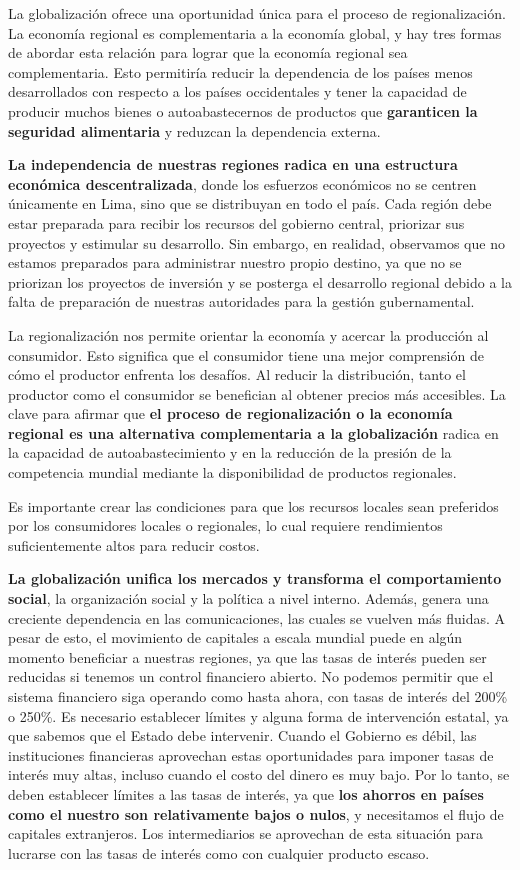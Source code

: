 \documentclass[
  jou,
  floatsintext,
  longtable,
  a4paper,
  nolmodern,
  notxfonts,
  notimes,
  12pt,
  colorlinks=true,linkcolor=blue,citecolor=blue,urlcolor=blue]{apa7}
\begin{document}
La globalización ofrece una oportunidad única para el proceso de
regionalización. La economía regional es complementaria a la economía
global, y hay tres formas de abordar esta relación para lograr que la
economía regional sea complementaria. Esto permitiría reducir la
dependencia de los países menos desarrollados con respecto a los países
occidentales y tener la capacidad de producir muchos bienes o
autoabastecernos de productos que \textbf{garanticen la seguridad
alimentaria} y reduzcan la dependencia externa.

\textbf{La independencia de nuestras regiones radica en una estructura
económica descentralizada}, donde los esfuerzos económicos no se centren
únicamente en Lima, sino que se distribuyan en todo el país. Cada región
debe estar preparada para recibir los recursos del gobierno central,
priorizar sus proyectos y estimular su desarrollo. Sin embargo, en
realidad, observamos que no estamos preparados para administrar nuestro
propio destino, ya que no se priorizan los proyectos de inversión y se
posterga el desarrollo regional debido a la falta de preparación de
nuestras autoridades para la gestión gubernamental.

La regionalización nos permite orientar la economía y acercar la
producción al consumidor. Esto significa que el consumidor tiene una
mejor comprensión de cómo el productor enfrenta los desafíos. Al reducir
la distribución, tanto el productor como el consumidor se benefician al
obtener precios más accesibles. La clave para afirmar que \textbf{el
proceso de regionalización o la economía regional es una alternativa
complementaria a la globalización} radica en la capacidad de
autoabastecimiento y en la reducción de la presión de la competencia
mundial mediante la disponibilidad de productos regionales.

Es importante crear las condiciones para que los recursos locales sean
preferidos por los consumidores locales o regionales, lo cual requiere
rendimientos suficientemente altos para reducir costos.

\textbf{La globalización unifica los mercados y transforma el
comportamiento social}, la organización social y la política a nivel
interno. Además, genera una creciente dependencia en las comunicaciones,
las cuales se vuelven más fluidas. A pesar de esto, el movimiento de
capitales a escala mundial puede en algún momento beneficiar a nuestras
regiones, ya que las tasas de interés pueden ser reducidas si tenemos un
control financiero abierto. No podemos permitir que el sistema
financiero siga operando como hasta ahora, con tasas de interés del
200\% o 250\%. Es necesario establecer límites y alguna forma de
intervención estatal, ya que sabemos que el Estado debe intervenir.
Cuando el Gobierno es débil, las instituciones financieras aprovechan
estas oportunidades para imponer tasas de interés muy altas, incluso
cuando el costo del dinero es muy bajo. Por lo tanto, se deben
establecer límites a las tasas de interés, ya que \textbf{los ahorros en
países como el nuestro son relativamente bajos o nulos}, y necesitamos
el flujo de capitales extranjeros. Los intermediarios se aprovechan de
esta situación para lucrarse con las tasas de interés como con cualquier
producto escaso.
\end{document}
